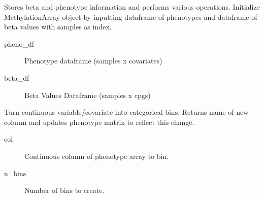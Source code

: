 \documentclass[letterpaper,10pt,english]{sphinxmanual}
\begin{document}

\begin{fulllineitems}
\label{\detokenize{index:pymethylprocess.MethylationDataTypes.MethylationArray}}
Stores beta and phenotype information and performs various operations.
Initialize MethylationArray object by inputting dataframe of phenotypes
and dataframe of beta values with samples as index.
\begin{description}
\item[{pheno\_df}] \leavevmode
Phenotype dataframe (samples x covariates)

\item[{beta\_df}] \leavevmode
Beta Values Dataframe (samples x cpgs)

\end{description}

\begin{fulllineitems}
\label{\detokenize{index:pymethylprocess.MethylationDataTypes.MethylationArray.bin_column}}
Turn continuous variable/covariate into categorical bins.
Returns name of new column and updates phenotype matrix to reflect this change.
\begin{description}
\item[{col}] \leavevmode
Continuous column of phenotype array to bin.

\item[{n\_bins}] \leavevmode
Number of bins to create.

\end{description}

\end{fulllineitems}



\end{fulllineitems}
\end{document}
